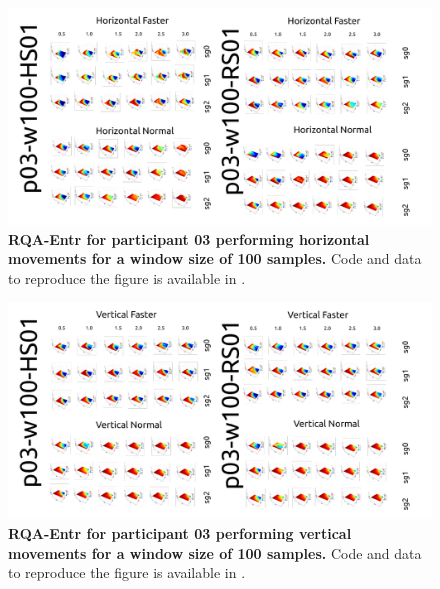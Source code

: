 \documentclass[12pt]{article}
\begin{document}
\newpage
\begin{figure}[ht!]
\centering
\includegraphics[scale=1.0]{sm-fig17}
    	\caption{
	{\bf RQA-Entr for participant 03 performing horizontal movements for a window size of 100 samples.}
	Code and data to reproduce the figure is available in \cite{srep2021}.
        }
    \label{fig-p03-H-w100}
\end{figure}
\begin{figure}[hb!]
\centering
\includegraphics[scale=1.0]{sm-fig18}
    	\caption{
	{\bf RQA-Entr for participant 03 performing vertical movements for a window size of 100 samples.}
	Code and data to reproduce the figure is available in \cite{srep2021}.
        }
    \label{fig-p03-V-w100}
\end{figure}
\end{document}
